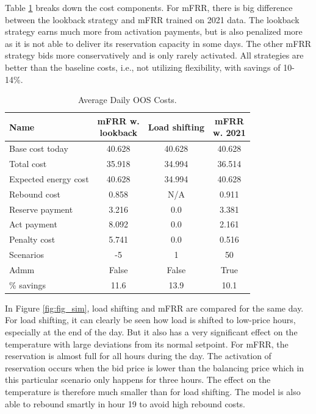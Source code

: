 Table \ref{tab:cases_compared} breaks down the cost components. For mFRR, there is big difference between the lookback strategy and mFRR trained on 2021 data. The lookback strategy earns much more from activation payments, but is also penalized more as it is not able to deliver its reservation capacity in some days. The other mFRR strategy bids more conservatively and is only rarely activated. All strategies are better than the baseline costs, i.e., not utilizing flexibility, with savings of 10-14\%.

\begin{flushleft}
    \begin{table}[!t]
        \caption{Average Daily OOS Costs.}
        \label{tab:cases_compared}
        \centering
        \begin{tabular}{lccc}
            \toprule
            Name                 & \thead{mFRR w.                   \\lookback} & Load shifting & \thead{mFRR \\w. 2021} \\
            \midrule
            Base cost today      & 40.628         & 40.628 & 40.628 \\
            Total cost           & 35.918         & 34.994 & 36.514 \\
            Expected energy cost & 40.628         & 34.994 & 40.628 \\
            Rebound cost         & 0.858          & N/A    & 0.911  \\
            Reserve payment      & 3.216          & 0.0    & 3.381  \\
            Act payment          & 8.092          & 0.0    & 2.161  \\
            Penalty cost         & 5.741          & 0.0    & 0.516  \\
            Scenarios            & -5             & 1      & 50     \\
            Admm                 & False          & False  & True   \\
            \% savings           & 11.6           & 13.9   & 10.1   \\
            \bottomrule
        \end{tabular}
    \end{table}
\end{flushleft}

In Figure \ref{fig:fig_sim}, load shifting and mFRR are compared for the same day. For load shifting, it can clearly be seen how load is shifted to low-price hours, especially at the end of the day. But it also has a very significant effect on the temperature with large deviations from its normal setpoint. For mFRR, the reservation is almost full for all hours during the day. The activation of reservation occurs when the bid price is lower than the balancing price which in this particular scenario only happens for three hours. The effect on the temperature is therefore much smaller than for load shifting. The model is also able to rebound smartly in hour 19 to avoid high rebound costs.

